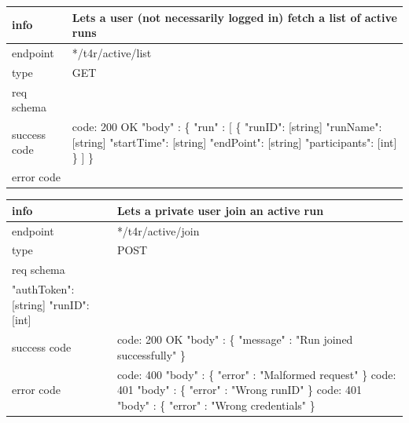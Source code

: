\documentclass[titlepage]{article}
\begin{document}
\begin{tabularx}{\textwidth}{lX} \hline
    info & Lets a user (not necessarily logged in) fetch a list of active runs \\ \hline
    endpoint & */t4r/active/list \\ \hline
    type & GET \\ \hline
    req schema & \\ \hline
    success code &
        code: 200 OK \newline  
        "body" : \{ \newline
        "run" : [ \{ \newline
        "runID": [string] \newline
        "runName": [string] \newline
        "startTime": [string] \newline
        "endPoint": [string] \newline
        "participants": [int] \newline
        \} ] \newline
        \} \\ \hline
    error code & \\ \hline
\end{tabularx}
		
\vspace{\baselineskip}

\begin{tabularx}{\textwidth}{lX} \hline
    info & Lets a private user join an active run \\ \hline
    endpoint & */t4r/active/join \\ \hline
    type & POST \\ \hline
    req schema & \\ \newline
    "authToken": [string] \newline
    "runID": [int] \\ \hline
    success code &
        code: 200 OK \newline  
        "body" : \{ \newline
        "message" : "Run joined successfully" \newline
        \} \\ \hline
    error code &
        code: 400 \newline
        "body" : \{ "error" : "Malformed request" \} \newline \newline
        code: 401 \newline
        "body" : \{ "error" : "Wrong runID" \} \newline \newline
        code: 401 \newline
        "body" : \{ "error" : "Wrong credentials" \} \\ \hline
\end{tabularx}
		
\end{document}
